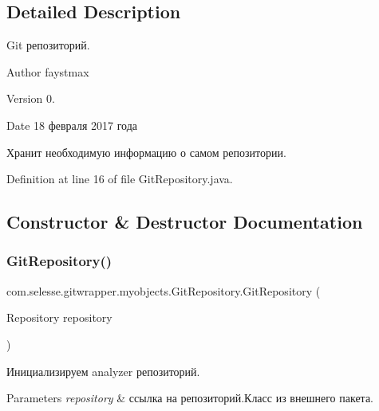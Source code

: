 \subsection{Detailed Description}
Git репозиторий. 

\begin{DoxyAuthor}{Author}
faystmax 
\end{DoxyAuthor}
\begin{DoxyVersion}{Version}
0. 
\end{DoxyVersion}
\begin{DoxyDate}{Date}
18 февраля 2017 года 
\end{DoxyDate}
Хранит необходимую информацию о самом репозитории. 

Definition at line 16 of file Git\+Repository.\+java.



\subsection{Constructor \& Destructor Documentation}
\mbox{\label{classcom_1_1selesse_1_1gitwrapper_1_1myobjects_1_1_git_repository_a29bd6c7c132cae2bbf0325ec1ebb59fd}} 
\subsubsection{\texorpdfstring{Git\+Repository()}{GitRepository()}}
{\footnotesize\ttfamily com.\+selesse.\+gitwrapper.\+myobjects.\+Git\+Repository.\+Git\+Repository (\begin{DoxyParamCaption}\item[{Repository}]{repository }\end{DoxyParamCaption})}

Инициализируем analyzer репозиторий.


\begin{DoxyParams}{Parameters}
{\em repository} & ссылка на репозиторий.\+Класс из внешнего пакета. \\
\hline
\end{DoxyParams}


